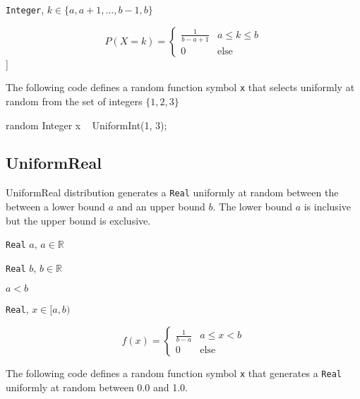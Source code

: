 \begin{itemize*}
\item[] \verb|Integer|, $k \in \{a, a+1, \ldots, b-1, b \}$
\end{itemize*}

\[
	P(X = k) = \left\{
		  \begin{array}{lr}
		    \frac{1}{b - a + 1} & a \leq k \leq b \\
		    0 					& \text{else}
		  \end{array}
		\right.
\]]

The following code defines a random function symbol \verb|x| that selects uniformly at random from the set of integers $\{1, 2, 3\}$

\begin{blogcode}
random Integer x ~ UniformInt(1, 3);
\end{blogcode}

\subsection{UniformReal}

UniformReal distribution generates a \verb|Real| uniformly at random between the between a lower bound $a$ and an upper bound $b$. The lower bound $a$ is inclusive but the upper bound is exclusive.

\begin{itemize*}
\item[] \verb|Real| $a$, $a \in \mathbb{R}$
\item[] \verb|Real| $b$, $b \in \mathbb{R}$
\item[] $a < b$

\end{itemize*}

\begin{itemize*}
\item[] \verb|Real|, $x \in [a, b)$
\end{itemize*}

\[
	f(x) = \left\{
		  \begin{array}{lr}
		    \frac{1}{b - a} & a \leq x < b \\
		    0 					& \text{else}
		  \end{array}
		\right.
\]

The following code defines a random function symbol \verb|x| that generates a \verb|Real| uniformly at random between 0.0 and 1.0.

